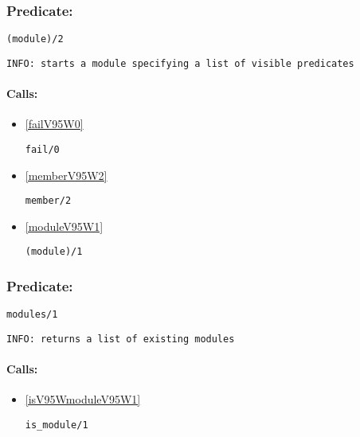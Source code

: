 \subsubsection{Predicate:} \label{moduleV95W2}

\begin{verbatim}
(module)/2
\end{verbatim}

{\small \begin{verbatim}
INFO: starts a module specifying a list of visible predicates

\end{verbatim}}
\paragraph{Calls:} 
\begin{itemize}
\item \ref{failV95W0} 
\begin{verbatim}
fail/0
\end{verbatim}

\item \ref{memberV95W2} 
\begin{verbatim}
member/2
\end{verbatim}

\item \ref{moduleV95W1} 
\begin{verbatim}
(module)/1
\end{verbatim}

\end{itemize}

\subsubsection{Predicate:} \label{modulesV95W1}

\begin{verbatim}
modules/1
\end{verbatim}

{\small \begin{verbatim}
INFO: returns a list of existing modules

\end{verbatim}}
\paragraph{Calls:} 
\begin{itemize}
\item \ref{isV95WmoduleV95W1} 
\begin{verbatim}
is_module/1
\end{verbatim}

\end{itemize}

